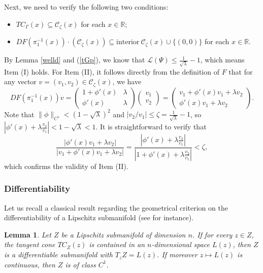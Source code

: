 \documentclass{amsart}
\newcommand{\R}{\mathbb{R}}
\newtheorem{Lemma}[Definition]{Lemma}
\begin{document}
	Next, we need to verify the following two conditions:
	\begin{itemize}
		\item [(I)] $TC_\Gamma(x)\subseteq \mathcal{C}_\zeta(x)$ for each $x\in \R$;
		\item [(II)] $DF(\pi_1^{-1}(x))\cdot(\mathcal{C}_\zeta(x))\subseteq \mathrm{interior}\ \mathcal{C}_\zeta(x)\cup \{(0,0)\}$  for each $x\in \R$.
	\end{itemize}
	By Lemma \ref{welld} and (\ref{tGp}), we know that $\mathcal{L}(\Psi)\leq \frac{1}{\sqrt{\lambda}}-1$, which means Item (I) holds.
	For Item (II), it follows directly from the definition of $F$ that for any vector $v = (v_1, v_2) \in \mathcal{C}_\zeta(x)$, we have
	\[
	DF(\pi_1^{-1}(x))v =
	\begin{pmatrix}
		1+\phi'(x) & \lambda \\
		\phi'(x) & \lambda
	\end{pmatrix}
	\begin{pmatrix}
		v_1 \\
		v_2
	\end{pmatrix}
	=
	\begin{pmatrix}
		v_1 + \phi'(x)v_1 + \lambda v_2 \\
		\phi'(x)v_1 + \lambda v_2
	\end{pmatrix}.
	\]
	Note that $\|\phi\|_{C^1} < (1 - \sqrt{\lambda})^2$ and $|v_2 / v_1| \leq \zeta = \frac{1}{\sqrt{\lambda}} - 1$, so $|\phi'(x)+\lambda \frac{v_2}{v_1}|<1-\sqrt{\lambda}<1$. It is straightforward to verify that
	\begin{equation}\label{test2}
		\frac{|\phi'(x)v_1 + \lambda v_2|}{|v_1 + \phi'(x)v_1 + \lambda v_2|}
		= \frac{|\phi'(x) + \lambda \frac{v_2}{v_1}|}{|1 + \phi'(x) + \lambda \frac{v_2}{v_1}|}
		< \zeta,
	\end{equation}
	which confirms the validity of Item (II).
	
	
	\subsubsection{Differentiability}
	Let us recall a classical result regarding the geometrical criterion on the differentiability of a Lipschitz submanifold (see \cite[Lemma 4.2]{BB} for instance).
	\begin{Lemma}\label{difli}
		Let \( Z \) be a Lipschitz submanifold of dimension \( n \). If for every \( z \in Z \), the tangent cone \( TC_Z(z) \) is contained in an \( n \)-dimensional space \( L(z) \), then \( Z \) is a differentiable submanifold with \( T_zZ = L(z) \). If moreover \( z \mapsto L(z) \) is continuous, then \( Z \) is of class \( C^1 \).
	\end{Lemma}
	
\end{document}
